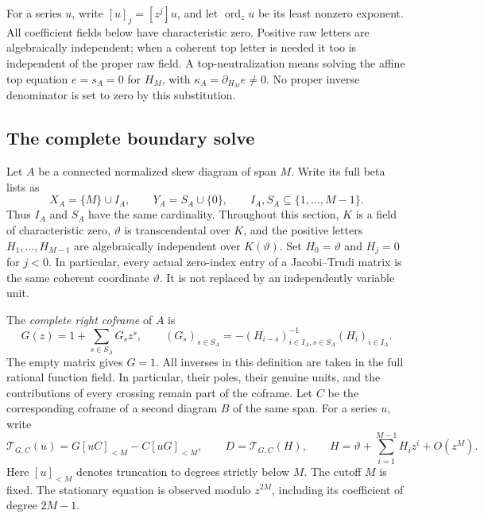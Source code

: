 \documentclass[11pt,a4paper]{amsart}
\numberwithin{equation}{section}
\theoremstyle{plain}
\theoremstyle{definition}
\newcommand{\ord}{\operatorname{ord}}
\begin{document}
For a series \(u\), write \([u]_j=[z^j]u\), and let \(\ord_z u\)
be its least nonzero exponent.  All coefficient fields below have
characteristic zero.  Positive raw letters are algebraically independent;
when a coherent top letter is needed it too is independent of the proper
raw field.  A top-neutralization means solving the affine top equation
\(e=s_A=0\) for \(H_M\), with \(\kappa_A=\partial_{H_M}e\ne0\).
No proper inverse denominator is set to zero by this substitution.

\subsection{The complete boundary solve}

Let \(A\) be a connected normalized skew diagram of span \(M\).  Write its
full beta lists as
\[
 X_A=\{M\}\cup I_A,\qquad Y_A=S_A\cup\{0\},\qquad
 I_A,S_A\subseteq\{1,\ldots,M-1\}.
\]
Thus \(I_A\) and \(S_A\) have the same cardinality.  Throughout this section,
\(K\) is a field of characteristic zero, \(\vartheta\) is transcendental over \(K\),
and the positive letters \(H_1,\ldots,H_{M-1}\) are algebraically
independent over \(K(\vartheta)\).  Set \(H_0=\vartheta\) and \(H_j=0\) for \(j<0\).
In particular, every actual zero-index entry of a Jacobi--Trudi matrix
is the same coherent coordinate \(\vartheta\).  It is not replaced by an
independently variable unit.

The \emph{complete right coframe} of \(A\) is
\begin{equation}\label{sc:coframe-definition}
 G(z)=1+\sum_{s\in S_A}G_sz^s,\qquad
 (G_s)_{s\in S_A}
   =-(H_{i-s})_{i\in I_A,s\in S_A}^{-1}(H_i)_{i\in I_A}.
\end{equation}
The empty matrix gives \(G=1\).  All inverses in this definition are
taken in the full rational function field.  In particular, their poles,
their genuine units, and the contributions of every crossing remain
part of the coframe.  Let \(C\) be the corresponding coframe of a second
diagram \(B\) of the same span.  For a series \(u\), write
\begin{equation}\label{sc:finite-operator}
 \mathcal T_{G,C}(u)
   =G[uC]_{<M}-C[uG]_{<M},\qquad
 D=\mathcal T_{G,C}(H),\qquad
 H=\vartheta+\sum_{i=1}^{M-1}H_i z^i+O(z^M).
\end{equation}
Here \([u]_{<M}\) denotes truncation to degrees strictly below \(M\).
The cutoff \(M\) is fixed.  The stationary equation is observed modulo
\(z^{2M}\), including its coefficient of degree \(2M-1\).
\end{document}
